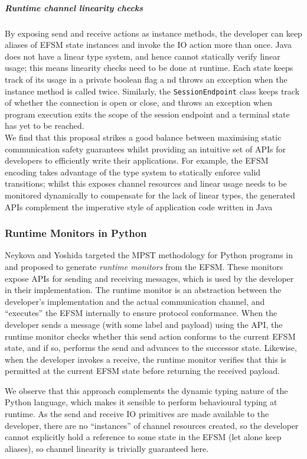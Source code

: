 \subparagraph{Runtime channel linearity checks}
By exposing send and receive actions as instance
methods, the developer can keep aliases of EFSM state instances
and invoke the IO action more than once. Java does not
have a linear type system, and hence cannot statically
verify linear usage; this means linearity checks need to be
done at runtime.
Each state keeps track of its usage in a private boolean flag a
nd throws an exception when the instance method is called twice.
Similarly, the \texttt{SessionEndpoint} class keeps track of 
whether the connection is open or close,
and throws an exception when program execution exits the 
scope of the session endpoint and a terminal state 
has yet to be reached.\\

We find that this proposal strikes a good balance 
between maximising static communication safety guarantees 
whilst providing an intuitive set of APIs for developers 
to efficiently write their applications. 
For example, the EFSM encoding takes advantage of the type system 
to statically enforce valid transitions; whilst this
exposes channel resources and linear usage needs to be
monitored dynamically to compensate for the lack of linear types,
the generated APIs complement the 
imperative style of application code written in Java


\subsubsection{Runtime Monitors in Python}
Neykova and Yoshida targeted the MPST methodology 
for Python programs in \cite{Python2017} 
and proposed to generate \textit{runtime monitors} 
from the EFSM.
These monitors expose APIs for sending and receiving messages,
which is used by the developer in their implementation. 
The runtime monitor is an abstraction between the 
developer's implementation and the actual communication channel, 
and ``executes'' the EFSM internally to ensure protocol conformance. 
When the developer sends a message (with some label and payload) 
using the API, the runtime monitor checks 
whether this send action conforms to the current EFSM state, 
and if so, 
performs the send and advances to the successor state. 
Likewise, when the developer invokes a receive, 
the runtime monitor verifies that this is permitted 
at the current EFSM state before returning the received payload.

We observe that this approach complements the 
dynamic typing nature of the Python language, 
which makes it sensible to perform behavioural typing at runtime.
As the send and receive IO primitives are
made available to the developer,
there are no ``instances'' of channel resources created,
so the developer cannot explicitly hold a reference to
some state in the EFSM (let alone keep aliases),
so channel linearity is trivially guaranteed here.

